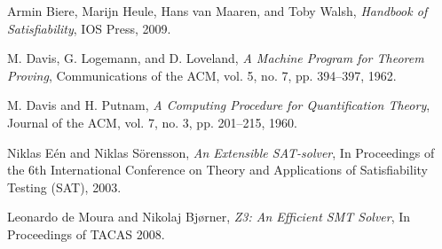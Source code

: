 \documentclass{article}
\begin{document}
\begin{thebibliography}{9}

Armin Biere, Marijn Heule, Hans van Maaren, and Toby Walsh, 
\textit{Handbook of Satisfiability}, IOS Press, 2009.

M. Davis, G. Logemann, and D. Loveland,
\textit{A Machine Program for Theorem Proving},
Communications of the ACM, vol. 5, no. 7, pp. 394–397, 1962.

M. Davis and H. Putnam,
\textit{A Computing Procedure for Quantification Theory},
Journal of the ACM, vol. 7, no. 3, pp. 201–215, 1960.

Niklas Eén and Niklas Sörensson,
\textit{An Extensible SAT-solver},
In Proceedings of the 6th International Conference on Theory and Applications of Satisfiability Testing (SAT), 2003.

Leonardo de Moura and Nikolaj Bjørner,
\textit{Z3: An Efficient SMT Solver},
In Proceedings of TACAS 2008.

\end{thebibliography}
\end{document}

